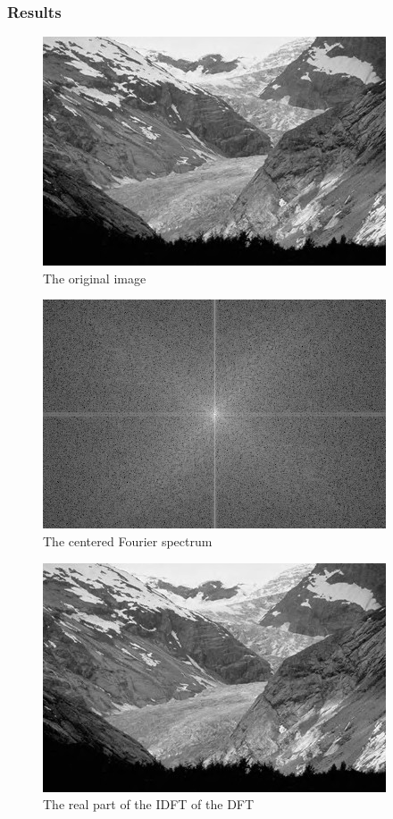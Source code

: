\documentclass{article}
\begin{document}
\subsubsection{Results}
\begin{figure}[H]
	\centering
	\includegraphics[width=288pt]{../img/02.png}
	\caption{The original image}
\end{figure}

\begin{figure}[H]
	\centering
	\includegraphics[width=288pt]{../result/dft-spectrum.png}
	\caption{The centered Fourier spectrum}
\end{figure}

\begin{figure}[H]
	\centering
	\includegraphics[width=288pt]{../result/dft-double.png}
	\caption{The real part of the IDFT of the DFT}
\end{figure}
\end{document}
